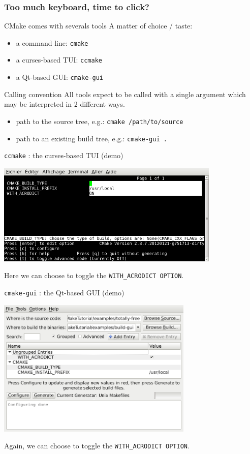 \documentclass[compress,slidestop,table
              ]
               {beamer}
\newcommand{\fname}[1]{\texttt{#1}}
\begin{document}
\begin{frame}[allowframebreaks]
\frametitle{Too much keyboard, time to click?}
\begin{block}{CMake comes with severals tools}
A matter of choice / taste:
\begin{itemize}
\item a command line: \fname{cmake}
\item a curses-based TUI: \fname{ccmake}
\item a Qt-based GUI: \fname{cmake-gui}
\end{itemize}
\end{block}
\begin{alertblock}{Calling convention}
All tools expect to be called with a single argument
which may be interpreted in 2 different ways.
\vspace*{0.3cm}
\begin{itemize}
\item path to the source tree, e.g.: \fname{cmake /path/to/source}
\item path to an \alert{existing} build tree, e.g.: \fname{cmake-gui .}
\end{itemize}
\end{alertblock}

\begin{center}
\fname{ccmake} : the curses-based TUI (demo)

\includegraphics[width=0.8\textwidth]{ccmake-1}

Here we can choose to toggle the \lstinline!WITH_ACRODICT OPTION!.
\end{center}

\begin{center}
\fname{cmake-gui} : the Qt-based GUI (demo)

\includegraphics[width=0.7\textwidth]{cmake-gui-1}

Again, we can choose to toggle the \lstinline!WITH_ACRODICT OPTION!.
\end{center}
\end{frame}
\end{document}

